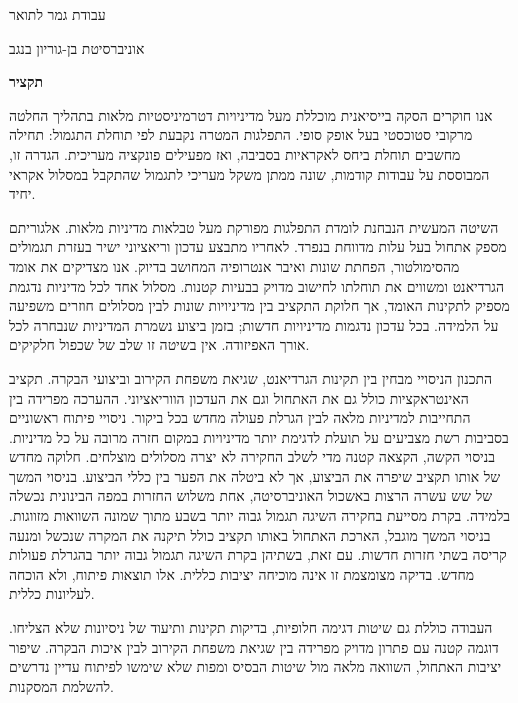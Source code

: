 \thispagestyle{empty}

\begin{center}
  {\Large\bfseries \DocumentTitleHebrew\par}
  \vspace{0.4cm}
  {\large \AuthorNameHebrew\par}
  \vspace{0.4cm}
  {\large עבודת גמר לתואר \DegreeNameHebrew\par}
  \vspace{0.2cm}
  {\large אוניברסיטת בן-גוריון בנגב\par}
  \vspace{0.2cm}
  \vspace{0.9cm}
  {\Large\bfseries תקציר\par}
\end{center}

אנו חוקרים הסקה בייסיאנית מוכללת מעל מדיניויות דטרמיניסטיות מלאות בתהליך
החלטה מרקובי סטוכסטי בעל אופק סופי. התפלגות המטרה נקבעת לפי תוחלת התגמול:
תחילה מחשבים תוחלת ביחס לאקראיות בסביבה, ואז מפעילים פונקציה מעריכית.
הגדרה זו, המבוססת על עבודות קודמות, שונה ממתן משקל מעריכי לתגמול שהתקבל
במסלול אקראי יחיד.

השיטה המעשית הנבחנת לומדת התפלגות מפורקת מעל טבלאות מדיניות מלאות.
אלגוריתם  מספק אתחול בעל עלות מדווחת בנפרד.
לאחריו מתבצע עדכון וריאציוני ישיר בעזרת תגמולים מהסימולטור, הפחתת שונות
ואיבר אנטרופיה המחושב בדיוק. אנו מצדיקים את אומד הגרדיאנט ומשווים את
תוחלתו לחישוב מדויק בבעיות קטנות. מסלול אחד לכל מדיניות נדגמת מספיק
לתקינות האומד, אך חלוקת התקציב בין מדיניויות שונות לבין מסלולים חוזרים
משפיעה על הלמידה. בכל עדכון נדגמות מדיניויות חדשות; בזמן ביצוע נשמרת
המדיניות שנבחרה לכל אורך האפיזודה. אין בשיטה זו שלב של שכפול חלקיקים.

התכנון הניסויי מבחין בין תקינות הגרדיאנט, שגיאת משפחת הקירוב וביצועי
הבקרה. תקציב האינטראקציות כולל גם את האתחול וגם את העדכון הווריאציוני.
ההערכה מפרידה בין התחייבות למדיניות מלאה לבין הגרלת פעולה מחדש בכל ביקור.
ניסויי פיתוח ראשוניים בסביבות רשת מצביעים על תועלת לדגימת יותר מדיניויות
במקום חזרה מרובה על כל מדיניות.
בניסוי הקשה, הקצאה קטנה מדי לשלב החקירה לא יצרה מסלולים מוצלחים.
חלוקה מחדש של אותו תקציב שיפרה את הביצוע, אך לא ביטלה את הפער בין כללי
הביצוע. בניסוי המשך של שש עשרה הרצות באשכול האוניברסיטה,
אחת משלוש החזרות במפה הבינונית נכשלה בלמידה.
בקרת  מסייעת בחקירה השיגה תגמול גבוה יותר בשבע מתוך שמונה
השוואות מזווגות. בניסוי המשך מוגבל, הארכת האתחול באותו תקציב כולל
תיקנה את המקרה שנכשל ומנעה קריסה בשתי חזרות חדשות.
עם זאת, בשתיהן בקרת  השיגה תגמול גבוה יותר בהגרלת פעולות מחדש.
בדיקה מצומצמת זו אינה מוכיחה יציבות כללית. אלו תוצאות פיתוח, ולא הוכחה
לעליונות כללית.

העבודה כוללת גם שיטות דגימה חלופיות, בדיקות תקינות ותיעוד של ניסיונות
שלא הצליחו. דוגמה קטנה עם פתרון מדויק מפרידה בין שגיאת משפחת הקירוב
לבין איכות הבקרה. שיפור יציבות האתחול, השוואה מלאה מול שיטות הבסיס
ומפות שלא שימשו לפיתוח עדיין נדרשים להשלמת המסקנות.

